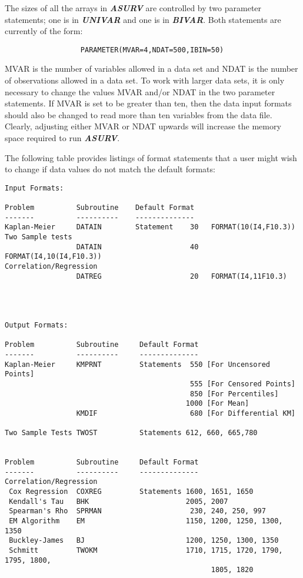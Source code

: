        The sizes of all the arrays in {\sl\bf ASURV} are controlled by 
two parameter statements; one is in {\sl\bf UNIVAR} and one is in 
{\sl\bf BIVAR}.  Both statements are currently of the form:

\begin{verbatim}
                  PARAMETER(MVAR=4,NDAT=500,IBIN=50)
\end{verbatim}  

MVAR is the number of variables allowed in a data set 
and NDAT is the number of observations allowed in a data set.  To work 
with larger data sets, it is only necessary to change the values MVAR and/or 
NDAT in the two parameter statements.  If MVAR is set to be greater 
than ten, then the data input formats should also be changed to read more 
than ten variables from the data file.  Clearly, adjusting either MVAR or NDAT
upwards will increase the memory space required to run {\sl\bf ASURV}.

       The following table provides listings of format statements that a user 
might wish to change if data values do not match the default formats:  

\begin{verbatim}
Input Formats:

Problem          Subroutine    Default Format      
-------          ----------    --------------
Kaplan-Meier     DATAIN        Statement    30   FORMAT(10(I4,F10.3))
Two Sample tests 
                 DATAIN                     40   FORMAT(I4,10(I4,F10.3))
Correlation/Regression
                 DATREG                     20   FORMAT(I4,11F10.3)




Output Formats:

Problem          Subroutine     Default Format
-------          ----------     --------------
Kaplan-Meier     KMPRNT         Statements  550 [For Uncensored Points] 
                                            555 [For Censored Points]  
                                            850 [For Percentiles]
                                           1000 [For Mean]
                 KMDIF                      680 [For Differential KM]

Two Sample Tests TWOST          Statements 612, 660, 665,780
        

Problem          Subroutine     Default Format
-------          ----------     --------------
Correlation/Regression
 Cox Regression  COXREG         Statements 1600, 1651, 1650
 Kendall's Tau   BHK                       2005, 2007
 Spearman's Rho  SPRMAN                     230, 240, 250, 997
 EM Algorithm    EM                        1150, 1200, 1250, 1300, 1350
 Buckley-James   BJ                        1200, 1250, 1300, 1350
 Schmitt         TWOKM                     1710, 1715, 1720, 1790, 1795, 1800,
                                                 1805, 1820
 
\end{verbatim}                             

